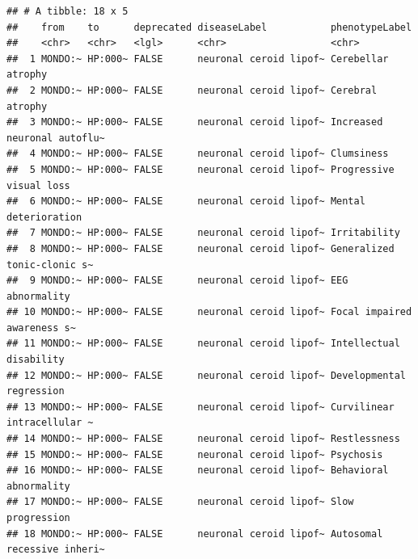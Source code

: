 \documentclass[9pt,a4paper,]{extarticle}
\newenvironment{Shaded}{\begin{snugshade}}{\end{snugshade}}
\newcommand{\CommentTok}[1]{\textcolor[rgb]{0.56,0.35,0.01}{\textit{#1}}}
\newcommand{\DataTypeTok}[1]{\textcolor[rgb]{0.13,0.29,0.53}{#1}}
\newcommand{\KeywordTok}[1]{\textcolor[rgb]{0.13,0.29,0.53}{\textbf{#1}}}
\newcommand{\NormalTok}[1]{#1}
\newcommand{\OperatorTok}[1]{\textcolor[rgb]{0.81,0.36,0.00}{\textbf{#1}}}
\newcommand{\StringTok}[1]{\textcolor[rgb]{0.31,0.60,0.02}{#1}}
\begin{document}
\begin{Shaded}
\end{Shaded}

\begin{verbatim}
## # A tibble: 18 x 5
##    from    to      deprecated diseaseLabel           phenotypeLabel             
##    <chr>   <chr>   <lgl>      <chr>                  <chr>                      
##  1 MONDO:~ HP:000~ FALSE      neuronal ceroid lipof~ Cerebellar atrophy         
##  2 MONDO:~ HP:000~ FALSE      neuronal ceroid lipof~ Cerebral atrophy           
##  3 MONDO:~ HP:000~ FALSE      neuronal ceroid lipof~ Increased neuronal autoflu~
##  4 MONDO:~ HP:000~ FALSE      neuronal ceroid lipof~ Clumsiness                 
##  5 MONDO:~ HP:000~ FALSE      neuronal ceroid lipof~ Progressive visual loss    
##  6 MONDO:~ HP:000~ FALSE      neuronal ceroid lipof~ Mental deterioration       
##  7 MONDO:~ HP:000~ FALSE      neuronal ceroid lipof~ Irritability               
##  8 MONDO:~ HP:000~ FALSE      neuronal ceroid lipof~ Generalized tonic-clonic s~
##  9 MONDO:~ HP:000~ FALSE      neuronal ceroid lipof~ EEG abnormality            
## 10 MONDO:~ HP:000~ FALSE      neuronal ceroid lipof~ Focal impaired awareness s~
## 11 MONDO:~ HP:000~ FALSE      neuronal ceroid lipof~ Intellectual disability    
## 12 MONDO:~ HP:000~ FALSE      neuronal ceroid lipof~ Developmental regression   
## 13 MONDO:~ HP:000~ FALSE      neuronal ceroid lipof~ Curvilinear intracellular ~
## 14 MONDO:~ HP:000~ FALSE      neuronal ceroid lipof~ Restlessness               
## 15 MONDO:~ HP:000~ FALSE      neuronal ceroid lipof~ Psychosis                  
## 16 MONDO:~ HP:000~ FALSE      neuronal ceroid lipof~ Behavioral abnormality     
## 17 MONDO:~ HP:000~ FALSE      neuronal ceroid lipof~ Slow progression           
## 18 MONDO:~ HP:000~ FALSE      neuronal ceroid lipof~ Autosomal recessive inheri~
\end{verbatim}
\end{document}

